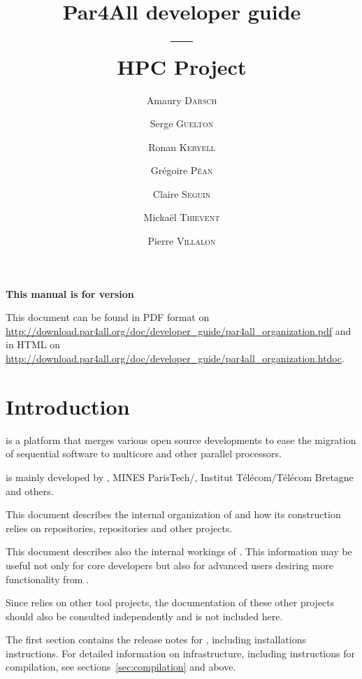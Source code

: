 \documentclass[a4paper]{article}
\newcommand{\LINK}[1]{\url{#1}\xspace}
\newcommand{\PfaOrganizationPDF}{\LINK{http://download.par4all.org/doc/developer_guide/par4all_organization.pdf}}
\newcommand{\PfaAllOrganizationHTDOC}{\LINK{http://download.par4all.org/doc/developer_guide/par4all_organization.htdoc}}
\begin{document}
\title{Par4All developer guide\\
  ---\\
  HPC Project}

\author{Amaury \textsc{Darsch} \and Serge \textsc{Guelton} \and Ronan
  \textsc{Keryell} \and Grégoire \textsc{Péan} \and Claire \textsc{Seguin}
  \and Mickaël \textsc{Thievent} \and Pierre \textsc{Villalon}}

\maketitle

\noindent\textbf{This manual is for \Apfa version }
\bigskip

This document can be found in PDF format on \PfaOrganizationPDF and in HTML
on \PfaAllOrganizationHTDOC.


\section{Introduction}
\label{sec:introduction}

\Apfa is a platform that merges various open source developments to ease
the migration of sequential software to multicore and other parallel
processors.

\Apfa is mainly developed by \Ahpcp, MINES ParisTech/\Acri, Institut
Télécom/Télécom Bretagne and others.

This document describes the internal organization of \Apfa and how its
construction relies on \Agit repositories, \Asvn repositories and other
projects.

This document describes also the internal workings of \Apfa.
This information may be useful not only for \Apfa core developers but
also for advanced users desiring more functionality from \Apfa.

Since \Apfa relies on other tool projects, the documentation of these other
projects should also be consulted independently and is not included here.

The first section contains the release notes for \Apfa, including
installations instructions. For detailed information on \Apfa
infrastructure, including instructions for compilation, see
sections~\ref{sec:compilation} and above.

\tableofcontents{}
\end{document}
